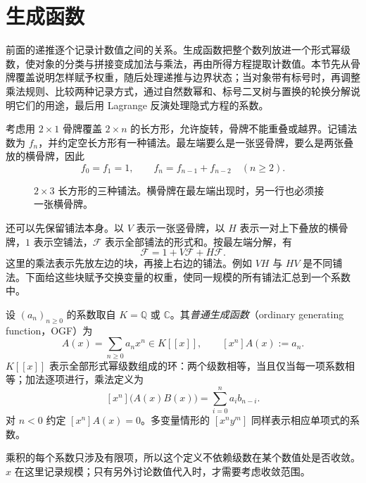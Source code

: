 \documentclass[lang=cn,a4paper,fontset=none,zihao=false,10pt,openany,twoside]{beautybook}
\numberwithin{algorithm}{chapter}
\newcommand{\Q}{\mathbb Q}
\newcommand{\C}{\mathbb C}
\begin{document}
\section{生成函数}\label{sec:generating-functions}
前面的递推逐个记录计数值之间的关系。生成函数把整个数列放进一个形式幂级数，使对象的分类与拼接变成加法与乘法，再由所得方程提取计数值。本节先从骨牌覆盖说明怎样赋予权重，随后处理递推与边界状态；当对象带有标号时，再调整乘法规则、比较两种记录方式，通过自然数幂和、标号二叉树与置换的轮换分解说明它们的用途，最后用 Lagrange 反演处理隐式方程的系数。

考虑用 $2\times1$ 骨牌覆盖 $2\times n$ 的长方形，允许旋转，骨牌不能重叠或越界。记铺法数为 $f_n$，并约定空长方形有一种铺法。最左端要么是一张竖骨牌，要么是两张叠放的横骨牌，因此
\[
 f_0=f_1=1,\qquad f_n=f_{n-1}+f_{n-2}\quad(n\ge2).
\]
\begin{figure}[H]
\centering
{}
\caption{$2\times3$ 长方形的三种铺法。横骨牌在最左端出现时，另一行也必须接一张横骨牌。}
\end{figure}

还可以先保留铺法本身。以 $V$ 表示一张竖骨牌，以 $H$ 表示一对上下叠放的横骨牌，$1$ 表示空铺法，$\mathcal F$ 表示全部铺法的形式和。按最左端分解，有
\[
 \mathcal F=1+V\mathcal F+H\mathcal F.
\]
这里的乘法表示先放左边的块，再接上右边的铺法。例如 $VH$ 与 $HV$ 是不同铺法。下面给这些块赋予交换变量的权重，使同一规模的所有铺法汇总到一个系数中。

\begin{definition}[普通生成函数与形式幂级数]
设 $(a_n)_{n\ge0}$ 的系数取自 $K=\Q$ 或 $\C$。其\emph{普通生成函数}（ordinary generating function，OGF）为
\[
 A(x)=\sum_{n\ge0}a_nx^n\in K[[x]],\qquad [x^n]A(x):=a_n.
\]
$K[[x]]$ 表示全部形式幂级数组成的环：两个级数相等，当且仅当每一项系数相等；加法逐项进行，乘法定义为
\[
 [x^n]\bigl(A(x)B(x)\bigr)=\sum_{i=0}^na_i b_{n-i}.
\]
对 $n<0$ 约定 $[x^n]A(x)=0$。多变量情形的 $[x^ny^m]$ 同样表示相应单项式的系数。
\end{definition}
乘积的每个系数只涉及有限项，所以这个定义不依赖级数在某个数值处是否收敛。$x$ 在这里记录规模；只有另外讨论数值代入时，才需要考虑收敛范围。
\end{document}
